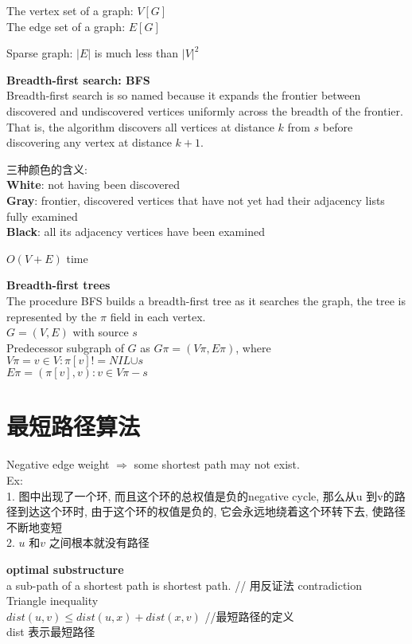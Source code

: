 \documentclass{article}
\begin{document}
\noindent
The vertex set of a graph: $V[G]$\\
The edge set of a graph: $E[G]$

Sparse graph: $|E|$ is much less than $|V|^2$

\textbf{Breadth-first search: BFS}\\
Breadth-first search is so named because it expands the frontier between discovered and undiscovered vertices uniformly across the breadth of the frontier. That is, the algorithm discovers all vertices at distance $k$ from $s$ before discovering any vertex at distance $k+1$.

\bigskip
三种颜色的含义:\\
\textbf{White}: not having been discovered\\
\textbf{Gray}: frontier, discovered vertices that have not yet had their adjacency lists fully examined\\
\textbf{Black}: all its adjacency vertices have been examined

\noindent
$O(V+E)$ time

\bigskip
\textbf{Breadth-first trees}\\
The procedure BFS builds a breadth-first tree as it searches the graph, the tree is represented by the $\pi$ field in each vertex.\\
$G=(V, E)$ with source $s$\\
Predecessor subgraph of $G$ as $G\pi = (V\pi, E\pi)$, where\\
$V\pi = {v \in V: \pi[v] != NIL} {\cup s}$\\
$E\pi = {(\pi[v], v) : v \in V\pi - {s}}$

\section{最短路径算法}
Negative edge weight $\Rightarrow$ some shortest path may not exist.\\
Ex:\\
1.	图中出现了一个环, 而且这个环的总权值是负的negative cycle, 那么从u 到v的路径到达这个环时, 由于这个环的权值是负的, 它会永远地绕着这个环转下去, 使路径不断地变短\\
2.	$u$ 和$v$ 之间根本就没有路径

\textbf{optimal substructure}\\
a sub-path of a shortest path is shortest path.  // 用反证法 contradiction\\
Triangle inequality\\
$dist(u,v) \leq dist(u,x) + dist(x,v)$ //最短路径的定义\\
dist 表示最短路径
\end{document}
